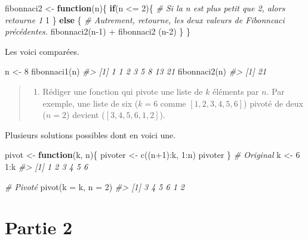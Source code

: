 \documentclass[
]{book}
\newenvironment{Shaded}{}{}
\newcommand{\AttributeTok}[1]{#1}
\newcommand{\CommentTok}[1]{\textit{#1}}
\newcommand{\ControlFlowTok}[1]{\textbf{#1}}
\newcommand{\DecValTok}[1]{#1}
\newcommand{\FunctionTok}[1]{#1}
\newcommand{\NormalTok}[1]{#1}
\newcommand{\OtherTok}[1]{#1}
\newcommand{\SpecialCharTok}[1]{#1}
\providecommand{\tightlist}{%
  \setlength{\itemsep}{0pt}\setlength{\parskip}{0pt}}
\begin{document}
\begin{Shaded}
\begin{Highlighting}[]
\NormalTok{fibonnaci2 }\OtherTok{\textless{}{-}} \ControlFlowTok{function}\NormalTok{(n)\{}
  \ControlFlowTok{if}\NormalTok{(n }\SpecialCharTok{\textless{}=} \DecValTok{2}\NormalTok{)\{}
    \CommentTok{\# Si la n est plus petit que 2, alors retourne 1}
    \DecValTok{1}
\NormalTok{  \} }\ControlFlowTok{else}\NormalTok{ \{}
    \CommentTok{\# Autrement, retourne, les deux valeurs de Fibonncaci précédentes.}
    \FunctionTok{fibonnaci2}\NormalTok{(n}\DecValTok{{-}1}\NormalTok{) }\SpecialCharTok{+} \FunctionTok{fibonnaci2}\NormalTok{ (n}\DecValTok{{-}2}\NormalTok{)}
\NormalTok{  \}}
\NormalTok{\}}
\end{Highlighting}
\end{Shaded}

Les voici comparées.

\begin{Shaded}
\begin{Highlighting}[]
\NormalTok{n }\OtherTok{\textless{}{-}} \DecValTok{8}
\FunctionTok{fibonnaci1}\NormalTok{(n)}
\CommentTok{\#\textgreater{} [1]  1  1  2  3  5  8 13 21}
\FunctionTok{fibonnaci2}\NormalTok{(n)}
\CommentTok{\#\textgreater{} [1] 21}
\end{Highlighting}
\end{Shaded}

\begin{quote}
\begin{enumerate}
\def\labelenumi{\arabic{enumi}.}
\setcounter{enumi}{5}
\tightlist
\item
  Rédiger une fonction qui pivote une liste de \(k\) éléments par \(n\). Par exemple, une liste de six (\(k=6\) comme \([1,2,3,4,5,6]\)) pivoté de deux (\(n=2\)) devient (\([3,4,5,6,1,2]\)).
\end{enumerate}
\end{quote}

Plusieurs solutions possibles dont en voici une.

\begin{Shaded}
\begin{Highlighting}[]
\NormalTok{pivot }\OtherTok{\textless{}{-}} \ControlFlowTok{function}\NormalTok{(k, n)\{}
\NormalTok{  pivoter }\OtherTok{\textless{}{-}} \FunctionTok{c}\NormalTok{((n}\SpecialCharTok{+}\DecValTok{1}\NormalTok{)}\SpecialCharTok{:}\NormalTok{k, }\DecValTok{1}\SpecialCharTok{:}\NormalTok{n)}
\NormalTok{  pivoter}
\NormalTok{\}}
\CommentTok{\# Original}
\NormalTok{k }\OtherTok{\textless{}{-}} \DecValTok{6}
\DecValTok{1}\SpecialCharTok{:}\NormalTok{k}
\CommentTok{\#\textgreater{} [1] 1 2 3 4 5 6}

\CommentTok{\# Pivoté}
\FunctionTok{pivot}\NormalTok{(}\AttributeTok{k =}\NormalTok{ k, }\AttributeTok{n =} \DecValTok{2}\NormalTok{)}
\CommentTok{\#\textgreater{} [1] 3 4 5 6 1 2}
\end{Highlighting}
\end{Shaded}

\hypertarget{partie-2}{%
\section*{Partie 2}\label{partie-2}}

\printbibliography
\end{document}
